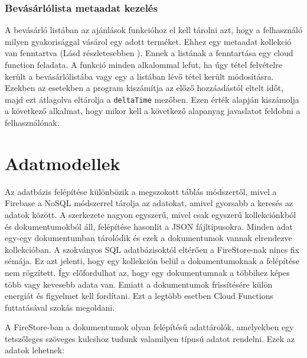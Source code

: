 \documentclass[12pt]{report}
\theoremstyle{definition}
\begin{document}
\subsection{Bevásárlólista metaadat kezelés}

A bevásárló listában az ajánlások funkcióhoz el kell tárolni azt, hogy a felhasználó milyen gyakorisággal vásárol egy adott terméket. 
Ehhez egy metaadat kollekció van fenntartva (Lásd részletesebben ). Ennek a listának a fenntartása egy cloud function feladata. 
A funkció minden alkalommal lefut, ha úgy tétel felvételre került a bevásárlólistába vagy egy a listában lévő tétel került módosításra. 
Ezekben az esetekben a program kiszámítja az előző hozzáadástól eltelt időt, majd ezt átlagolva eltárolja a \texttt{deltaTime} mezőben.
Ezen érték alapján kiszámolja a következő alkalmat, hogy mikor kell a következő alapanyag javaslatot feldobni a felhasználónak.



\chapter{Adatmodellek}
\label{dataSchemes}
Az adatbázis felépítése különbözik a megszokott táblás módszertől, mivel a Firebase a NoSQL módszerrel tárolja az adatokat, amivel gyorsabb a keresés az adatok között. A szerkezete nagyon egyszerű, mivel csak egyszerű kollekciónkból és dokumentumokból áll, felépítése hasonlít a JSON fájltípusokra. Minden adat egy-egy dokumentumban tárolódik és ezek a dokumentumok vannak elrendezve kollekcióban. A szokványos SQL adatbázisoktól eltérően a FireStore-nak nincs fix sémája. Ez azt jelenti, hogy egy kollekción belül a dokumentumoknak a felépítése nem rögzített. Így előfordulhat az, hogy egy dokumentumnak a többihez képes több vagy kevesebb adata van. Emiatt a dokumentumok frissítésére külön energiát és figyelmet kell fordítani. Ezt a legtöbb esetben Cloud Functions futtatásával szokás megoldani.

A FireStore-ban a dokumentumok olyan felépítésű adattárolók, amelyekben egy tetszőleges szöveges kulcshoz tudunk valamilyen típusú adatot rendelni. Ezek az adatok lehetnek: 
\end{document}

